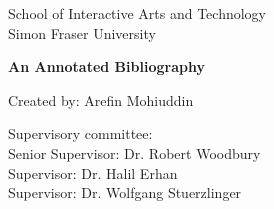 \documentclass[12pt]{article}
\begin{document}
\begin{center}

        School of Interactive Arts and Technology\\
        Simon Fraser University
        
        \bigskip
        \bigskip
        \bigskip
        \bigskip
        
        {\Large\textbf{An Annotated Bibliography}}
        \medskip

        {\large   Created by: Arefin Mohiuddin
%       
%       
        }
        
        \bigskip
        \bigskip
        \bigskip
        \bigskip
        
        \begin{center}
        Supervisory committee:\\
        Senior Supervisor: Dr. Robert Woodbury\\
        Supervisor: Dr. Halil Erhan\\
        Supervisor: Dr. Wolfgang Stuerzlinger
        \end{center}
\end{center}


\newpage
\tableofcontents
\end{document}
